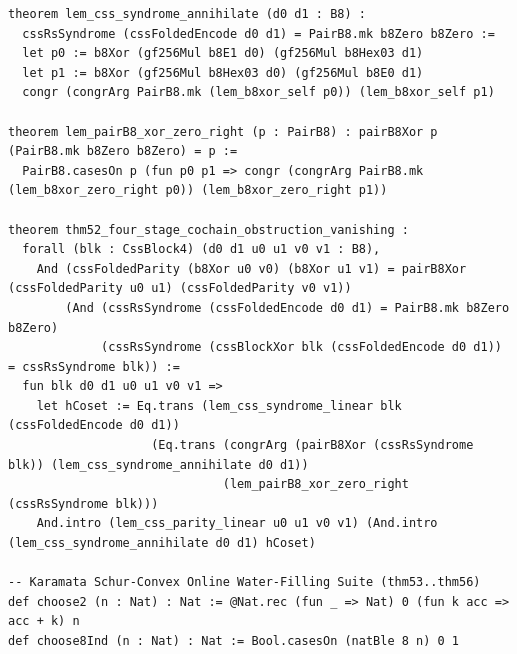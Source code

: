 \documentclass[11pt,letterpaper]{article}
\theoremstyle{spectralthm}
\begin{document}
\begin{lstlisting}[language=Lean4,caption={Standalone Pure Init.Prelude Term-Mode Lean 4 Kernel Suite (thm30--thm61, v0.0.0, 0 sorry, 0 axioms).},label={lst:lean_unified}]
theorem lem_css_syndrome_annihilate (d0 d1 : B8) :
  cssRsSyndrome (cssFoldedEncode d0 d1) = PairB8.mk b8Zero b8Zero :=
  let p0 := b8Xor (gf256Mul b8E1 d0) (gf256Mul b8Hex03 d1)
  let p1 := b8Xor (gf256Mul b8Hex03 d0) (gf256Mul b8E0 d1)
  congr (congrArg PairB8.mk (lem_b8xor_self p0)) (lem_b8xor_self p1)

theorem lem_pairB8_xor_zero_right (p : PairB8) : pairB8Xor p (PairB8.mk b8Zero b8Zero) = p :=
  PairB8.casesOn p (fun p0 p1 => congr (congrArg PairB8.mk (lem_b8xor_zero_right p0)) (lem_b8xor_zero_right p1))

theorem thm52_four_stage_cochain_obstruction_vanishing :
  forall (blk : CssBlock4) (d0 d1 u0 u1 v0 v1 : B8),
    And (cssFoldedParity (b8Xor u0 v0) (b8Xor u1 v1) = pairB8Xor (cssFoldedParity u0 u1) (cssFoldedParity v0 v1))
        (And (cssRsSyndrome (cssFoldedEncode d0 d1) = PairB8.mk b8Zero b8Zero)
             (cssRsSyndrome (cssBlockXor blk (cssFoldedEncode d0 d1)) = cssRsSyndrome blk)) :=
  fun blk d0 d1 u0 u1 v0 v1 =>
    let hCoset := Eq.trans (lem_css_syndrome_linear blk (cssFoldedEncode d0 d1))
                    (Eq.trans (congrArg (pairB8Xor (cssRsSyndrome blk)) (lem_css_syndrome_annihilate d0 d1))
                              (lem_pairB8_xor_zero_right (cssRsSyndrome blk)))
    And.intro (lem_css_parity_linear u0 u1 v0 v1) (And.intro (lem_css_syndrome_annihilate d0 d1) hCoset)

-- Karamata Schur-Convex Online Water-Filling Suite (thm53..thm56)
def choose2 (n : Nat) : Nat := @Nat.rec (fun _ => Nat) 0 (fun k acc => acc + k) n
def choose8Ind (n : Nat) : Nat := Bool.casesOn (natBle 8 n) 0 1


\end{lstlisting}
\end{document}
